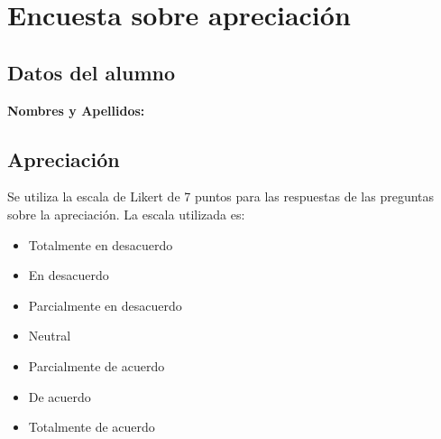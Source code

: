 \section{Encuesta sobre apreciación}

\subsection{Datos del alumno}
\tabitem{} \textbf{Nombres y Apellidos:}

\subsection{Apreciación}

Se utiliza la escala de Likert de 7 puntos para las respuestas de las preguntas
sobre la apreciación. La escala utilizada es:

\begin{itemize}
    \item Totalmente en desacuerdo
    \item En desacuerdo
    \item Parcialmente en desacuerdo
    \item Neutral
    \item Parcialmente de acuerdo
    \item De acuerdo
    \item Totalmente de acuerdo
\end{itemize}

